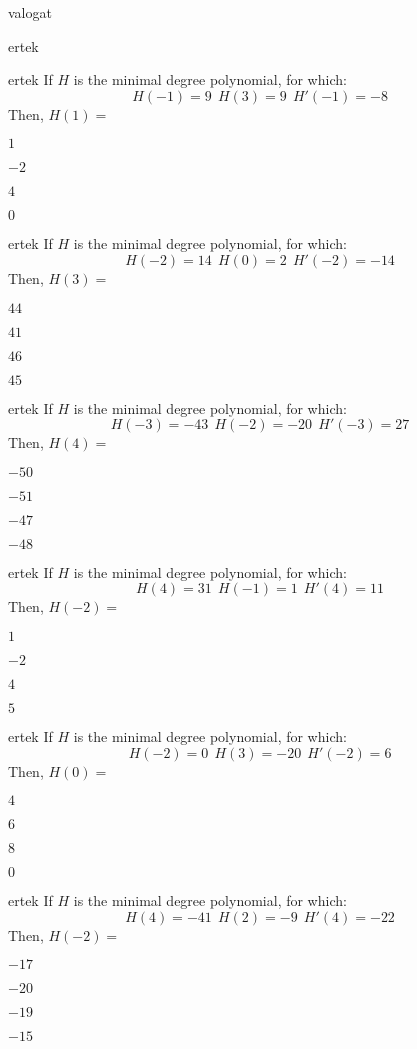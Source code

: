 \documentclass[12pt]{article}
\begin{document}
\begin{quiz}{valogat}
\begin{multi}{ertek}
\end{multi}
\begin{multi}{ertek}
If $H$ is the minimal degree polynomial, for which:
$$
H(-1)=9 \ \  H(3)=9 \ \ H'(-1)=-8
$$
Then, $H(1)=$
\item* $ 1 $
\item  $ -2 $
\item  $ 4 $
\item  $ 0 $
\end{multi}
\begin{multi}{ertek}
If $H$ is the minimal degree polynomial, for which:
$$
H(-2)=14 \ \  H(0)=2 \ \ H'(-2)=-14
$$
Then, $H(3)=$
\item* $ 44 $
\item  $ 41 $
\item  $ 46 $
\item  $ 45 $
\end{multi}
\begin{multi}{ertek}
If $H$ is the minimal degree polynomial, for which:
$$
H(-3)=-43 \ \  H(-2)=-20 \ \ H'(-3)=27
$$
Then, $H(4)=$
\item* $ -50 $
\item  $ -51 $
\item  $ -47 $
\item  $ -48 $
\end{multi}
\begin{multi}{ertek}
If $H$ is the minimal degree polynomial, for which:
$$
H(4)=31 \ \  H(-1)=1 \ \ H'(4)=11
$$
Then, $H(-2)=$
\item* $ 1 $
\item  $ -2 $
\item  $ 4 $
\item  $ 5 $
\end{multi}
\begin{multi}{ertek}
If $H$ is the minimal degree polynomial, for which:
$$
H(-2)=0 \ \  H(3)=-20 \ \ H'(-2)=6
$$
Then, $H(0)=$
\item* $ 4 $
\item  $ 6 $
\item  $ 8 $
\item  $ 0 $
\end{multi}
\begin{multi}{ertek}
If $H$ is the minimal degree polynomial, for which:
$$
H(4)=-41 \ \  H(2)=-9 \ \ H'(4)=-22
$$
Then, $H(-2)=$
\item* $ -17 $
\item  $ -20 $
\item  $ -19 $
\item  $ -15 $

\end{multi}
\end{quiz}
\end{document}
